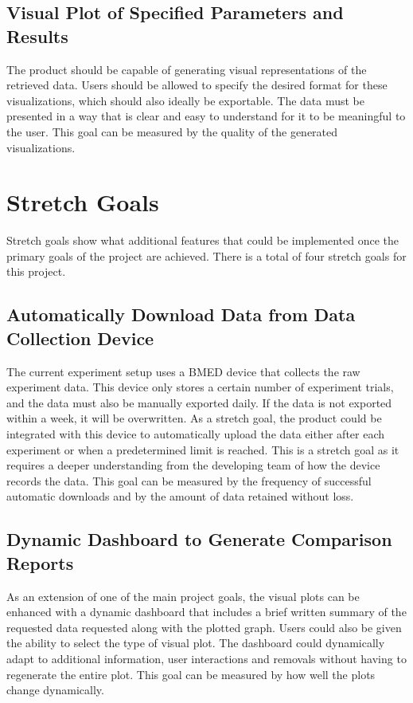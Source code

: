 \documentclass{article}
\begin{document}
\subsection{Visual Plot of Specified Parameters and Results}
The product should be capable of generating visual representations of the
retrieved data. Users should be allowed to specify the desired format for these
visualizations, which should also ideally be exportable. The data must be
presented in a way that is clear and easy to understand for it to be meaningful
to the user. This goal can be measured by the quality of the generated
visualizations.

\section{Stretch Goals}
Stretch goals show what additional features that could be implemented once the
primary goals of the project are achieved. There is a total of four stretch goals
for this project.
\subsection{Automatically Download Data from Data Collection Device}
The current experiment setup uses a BMED device that collects the raw
experiment data. This device only stores a certain number of experiment trials,
and the data must also be manually exported daily. If the data is not exported
within a week, it will be overwritten. As a stretch goal, the product could be
integrated with this device to automatically upload the data either after each
experiment or when a predetermined limit is reached.
This is a stretch goal as it requires a deeper understanding from the developing
team of how the device records the data. This goal can be measured by the
frequency of successful automatic downloads and by the amount of data retained
without loss.

\subsection{Dynamic Dashboard to Generate Comparison Reports}
As an extension of one of the main project goals, the visual plots can be
enhanced with a dynamic dashboard that includes a brief written summary of the
requested data requested along with the plotted graph. Users could also be given
the ability to select the type of visual plot. The dashboard could dynamically
adapt to additional information, user interactions and removals without having
to regenerate the entire plot. This goal can be measured by how well the plots
change dynamically.
\end{document}
